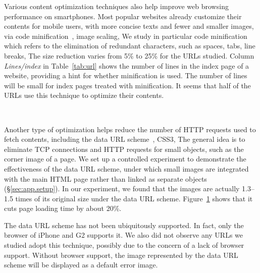 Various content optimization techniques also help improve web 
browsing performance on smartphones. Most popular websites already 
customize their contents for mobile users, with more concise texts 
and fewer and smaller images, \eg via code 
minification~\cite{minification}, image scaling, \etc We study in 
particular code minification which refers to the elimination of 
redundant characters, such as spaces, tabs, line breaks, \etc The 
size reduction varies from 5\% to 25\% for the URLs studied. 
Column {\em Lines/index} in Table~\ref{tab:url} shows the number of 
lines in the index page of a website, providing a hint for whether 
minification is used. The number of lines will be small for index
pages treated with minification. It seems that half of the URLs use 
this technique to optimize their contents.


\begin{figure}[t]
\centering
{}\\
\label{fig:web_dataurl}
\end{figure}

Another type of optimization helps reduce the number of HTTP 
requests used to fetch contents, including the data URL 
scheme~\cite{rfc2397}, CSS3, \etc The general idea is to eliminate 
TCP connections and HTTP requests for small objects, such as the 
corner image of a page. 
We set up a controlled experiment to demonstrate the effectiveness of the data URL scheme, under which small images are integrated with the main HTML page rather than linked as separate objects (\S\ref{sec:app.setup}). 
In our experiment, we found that the images are actually 1.3--1.5 
times of its original size under the data URL scheme. 
Figure~\ref{fig:web_dataurl} shows that it cuts page loading
time by about 20\%.

The data URL scheme has not been ubiquitously supported. In fact, 
only the browser of iPhone and G2 supports it. We also did not 
observe any URLs we studied adopt this technique, possibly due to the 
concern of a lack of browser support. Without browser support, the 
image represented by the data URL scheme will be displayed as a 
default error image.

